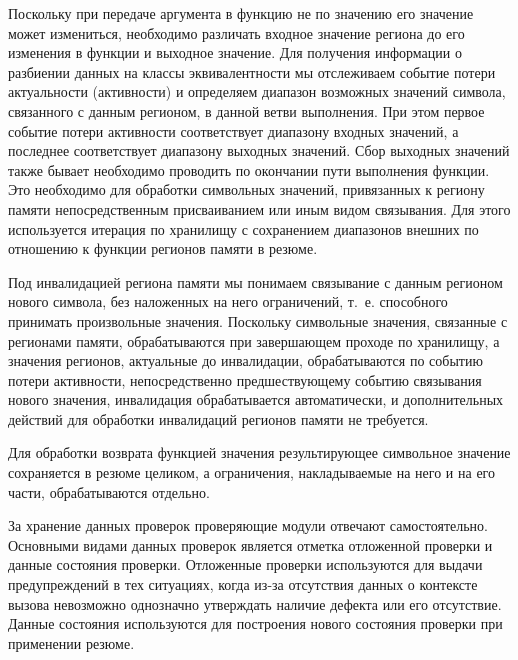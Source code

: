 Поскольку при передаче аргумента в функцию не по значению его значение может измениться, необходимо различать входное значение региона до его изменения в функции и выходное значение. Для получения информации о разбиении данных на классы эквивалентности мы отслеживаем событие потери актуальности (активности) и определяем диапазон возможных значений символа, связанного с данным регионом, в данной ветви выполнения. При этом первое событие потери активности соответствует диапазону входных значений, а последнее соответствует диапазону выходных значений. Сбор выходных значений также бывает необходимо проводить по окончании пути выполнения функции. Это необходимо для обработки символьных значений, привязанных к региону памяти непосредственным присваиванием или иным видом связывания. Для этого используется итерация по хранилищу с сохранением диапазонов внешних по отношению к функции регионов памяти в резюме. 

Под инвалидацией региона памяти мы понимаем связывание с данным регионом нового символа, без наложенных на него ограничений, т.~е. способного принимать произвольные значения. Поскольку символьные значения, связанные с регионами памяти, обрабатываются при завершающем проходе по хранилищу, а значения регионов, актуальные до инвалидации, обрабатываются по событию потери активности, непосредственно предшествующему событию связывания нового значения, инвалидация обрабатывается автоматически, и дополнительных действий для обработки инвалидаций регионов памяти не требуется.

Для обработки возврата функцией значения результирующее символьное значение сохраняется в резюме целиком, а ограничения, накладываемые на него и на его части, обрабатываются отдельно.

За хранение данных проверок проверяющие модули отвечают самостоятельно. Основными видами данных проверок является отметка отложенной проверки и данные состояния проверки. Отложенные проверки используются для выдачи предупреждений в тех ситуациях, когда из-за отсутствия данных о контексте вызова невозможно однозначно утверждать наличие дефекта или его отсутствие. Данные состояния используются для построения нового состояния проверки при применении резюме. 

